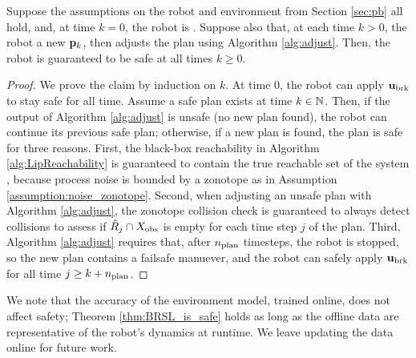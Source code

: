 \begin{theorem}\label{thm:BRSL_is_safe}
Suppose the assumptions on the robot and environment from Section \ref{sec:pb} all hold, and, at time $k = 0$, the robot is .
Suppose also that, at each time $k > 0$, the robot  a new ${\mathbf{p}}_k$, then adjusts the plan using Algorithm \ref{alg:adjust}.
Then, the robot is guaranteed to be safe at all times $k \geq 0$.
\end{theorem}
\begin{proof}
We prove the claim by induction on $k$.
At time $0$, the robot can apply ${\mathbf{u}}_{\mathrm{\textnormal{brk}}}$ to stay safe for all time.
Assume a safe plan exists at time $k \in {\mathbb{N}}$.
Then, if the output of Algorithm \ref{alg:adjust} is unsafe (no new plan found), the robot can continue its previous safe plan; otherwise, if a new plan is found, the plan is safe for three reasons.
First, the black-box reachability in Algorithm \ref{alg:LipReachability} is guaranteed to contain the true reachable set of the system \cite[Theorem 2]{alanwar2020data_conf}, because process noise is bounded by a zonotope as in Assumption \ref{assumption:noise_zonotope}.
Second, when adjusting an unsafe plan with Algorithm \ref{alg:adjust}, the zonotope collision check is guaranteed to always detect collisions \cite[Prop. 2]{conf:const_zono} to assess if ${\hat{R}}_j \cap X_{\mathrm{\textnormal{obs}}}$ is empty for each time step $j$ of the plan.
Third, Algorithm \ref{alg:adjust} requires that, after ${n_{\mathrm{\textnormal{plan}}}}$ timesteps, the robot is stopped, so the new plan contains a failsafe manuever, and the robot can safely apply ${\mathbf{u}}_{\mathrm{\textnormal{brk}}}$ for all time $j \geq k+{n_{\mathrm{\textnormal{plan}}}}$.
\end{proof}



We note that the accuracy of the environment model, trained online, does not affect safety; Theorem \ref{thm:BRSL_is_safe} holds as long as the offline data are representative of the robot's dynamics at runtime.
We leave updating the data online for future work.

